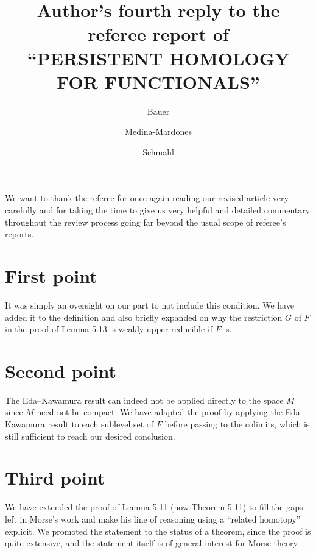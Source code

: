 \documentclass{article}
\title{Author's fourth reply to the referee report of \\ \textsc{
		``PERSISTENT HOMOLOGY FOR FUNCTIONALS''
	}
}
\author{Bauer \and Medina-Mardones \and Schmahl}
\begin{document}
	\maketitle
	We want to thank the referee for once again reading our revised article very carefully and for taking the time to give us very helpful and detailed commentary throughout the review process going far beyond the usual scope of referee's reports.
 
	\section{First point}
	It was simply an oversight on our part to not include this condition. We have added it to the definition and also briefly expanded on why the restriction $G$ of $F$ in the proof of Lemma 5.13 is weakly upper-reducible if $F$ is.
	\section{Second point}
	The Eda--Kawamura result can indeed not be applied directly to the space $M$ since $M$ need not be compact. We have adapted the proof by applying the Eda--Kawamura result to each sublevel set of $F$ before passing to the colimits, which is still sufficient to reach our desired conclusion.
	\section{Third point}
	We have extended the proof of Lemma 5.11 (now Theorem 5.11) to fill the gaps left in Morse's work and make his line of reasoning using a ``related homotopy'' explicit. We promoted the statement to the status of a theorem, since the proof is quite extensive, and the statement itself is of general interest for Morse theory. 
\end{document}
